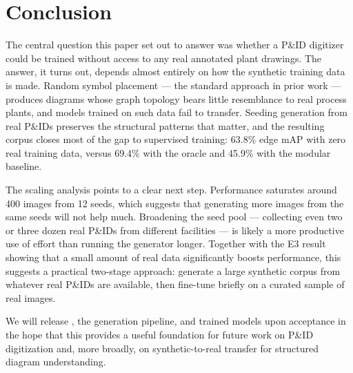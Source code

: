 \section{Conclusion}
\label{sec:conclusion}

The central question this paper set out to answer was whether a
P\&ID digitizer could be trained without access to any real
annotated plant drawings.
The answer, it turns out, depends almost entirely on how the synthetic
training data is made.
Random symbol placement --- the standard approach in prior work ---
produces diagrams whose graph topology bears little resemblance to real
process plants, and models trained on such data fail to transfer.
Seeding generation from real P\&IDs preserves the structural patterns
that matter, and the resulting \ours{} corpus closes most of the
gap to supervised training: 63.8\% edge mAP with zero real training
data, versus 69.4\% with the oracle and 45.9\% with the modular baseline.

The scaling analysis points to a clear next step.
Performance saturates around 400 images from 12 seeds, which
suggests that generating more images from the same seeds will not
help much.
Broadening the seed pool --- collecting even two or three dozen real
P\&IDs from different facilities --- is likely a more productive
use of effort than running the generator longer.
Together with the E3 result showing that a small amount of real data
significantly boosts performance, this suggests a practical two-stage
approach: generate a large synthetic corpus from whatever real P\&IDs
are available, then fine-tune briefly on a curated sample of real images.

We will release \ours{}, the generation pipeline, and trained models
upon acceptance in the hope that this provides a useful foundation
for future work on P\&ID digitization and, more broadly, on
synthetic-to-real transfer for structured diagram understanding.
